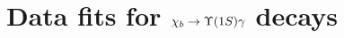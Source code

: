 \section{Data fits for \texorpdfstring{$\chib \to \Y1S \gamma$}{chib --> Y(1S) gamma} decays}
\label{sec:chib:ups1s:fits}


